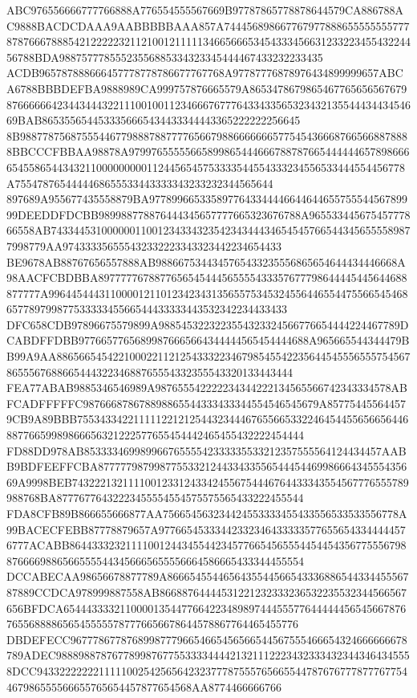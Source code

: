 ABC976556666777766888A776554555567669B97787865778878644579CA886788AC9888BACDCDAAA9AABBBBBAAA857A74445689866776797788865555555577787876667888542122222321121001211111346656665345433345663123322345543224456788BDA98875777855523556885334323345444467433232233435
ACDB965787888666457778778786677767768A97787776878976434899999657ABCA6788BBBDEFBA9888989CA999757876665579A865347867986546776565656767987666666423443444322111001001123466676777643343356532343213554443443454669BAB8653556544533356665434433344443365222222256645
8B9887787568755544677988878877776566798866666665775454366687665668878888BBCCCFBBAA98878A9799765555566589986544466678878766544444465789866665455865443432110000000001124456545753333544554333234556533444554456778A7554787654444468655533443333343233232344565644
897689A955677435558879BA977899665335897764334444664464465575554456789999DEEDDFDCBB989988778876444345657777665323676788A96553344567545777866558AB74334453100000011001234334323542343444346545457665443456555589877998779AA974333356555432332223343323442234654433
BE9678AB88767656557888AB9886675344345765433235556865654644434446668A98AACFCBDBBA8977777678877656545444565555433357677798644445445644688877777A996445444311000012110123423431356557534532455644655447556654546865778979987753333345566544433333443532342234433433
DFC658CDB97896675579899A9885453223223554323324566776654444224467789DCABDFFDBB97766577656899876665664344444565454444688A965665544344479BB99A9AA886566545422100022112125433322346798545542235644545556555754567865556768866544432234688765554332355543320133443444
FEA77ABAB9885346546989A987655542222234344222134565566742343334578ABFCADFFFFFC987666878678898865544333433344554546545679A857754455644579CB9A89BBB7553433422111112212125443234446765566533224645445565665644688776659989866656321222577655454442465455432222454444
FD88DD978AB85333346998996676555542333335533212357555564124434457AABB9BDFEEFFCBA877777987998775533212443343355654445446998666434555435669A9998BEB743222132111100123312433424556754446764433343554567776555789988768BA87776776432223455554554575575565433222455544
FDA8CFB89B866655666877AA756654563234424553333455433556533533556778A99BACECFEBB87778879657A977665453334423323464333335776556543344444576777ACABB86443332321111001244345544234577665456555445445435677555679887666698865665555443456665655556664586665433344455554
DCCABECAA98656678877789A866654554465643554456654333688654433445556787889CCDCA978999887558AB86688764444531221232333236532235532344566567656BFDCA65444333321100001354477664223489897444555776444444565456678767655688886565455555787776656678644578867764465455776
DBDEFECC967778677876899877796654665456566544567555466654324666666678789ADEC9888988787677899876775533334444213211122234323334323443464345558DCC943322222221111100254256564232377787555765665544787676777877767754467986555566655765654457877654568AA8774466666766
